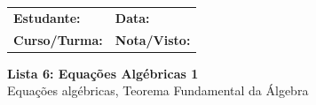 \documentclass[12pt,a4paper]{article}
\begin{document}
\begin{tcolorbox}[colback=bglight, colframe=primary, boxrule=1pt, arc=3pt]
  \sffamily\small
  \begin{tabular}{@{}p{} p{}@{}}
    \textbf{Estudante:} \hrulefill & \textbf{Data:} \hrulefill \\[0.25cm]
    \textbf{Curso/Turma:} \hrulefill & \textbf{Nota/Visto:} \hrulefill
  \end{tabular}
\end{tcolorbox}

\begin{center}
  {\LARGE\bfseries\color{primary} Lista 6: Equações Algébricas 1} \\[0.1cm]
  {\small\sffamily\color{gray} Equações algébricas, Teorema Fundamental da Álgebra}
\end{center}

\vspace{0.1cm}

 
\end{document}
